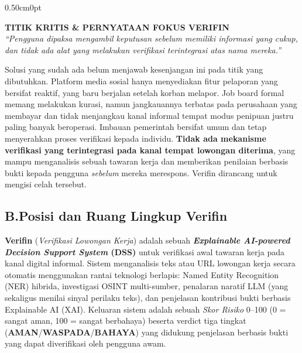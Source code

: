 \documentclass[12pt,a4paper]{article}
\begin{document}
\begin{adjustwidth}{0.50cm}{0pt}
\begin{tcolorbox}[colback=verfinblue!5, colframe=verfinblue!75, boxrule=0.8pt, arc=2mm, left=4mm, right=4mm, top=3mm, bottom=3mm]
\centering\small
\textcolor{verfinblue!90}{\textbf{TITIK KRITIS \& PERNYATAAN FOKUS VERIFIN}} \\[3pt]
\itshape ``Pengguna dipaksa mengambil keputusan sebelum memiliki informasi yang cukup, dan tidak ada alat yang melakukan verifikasi terintegrasi atas nama mereka.''
\end{tcolorbox}
\end{adjustwidth}

Solusi yang sudah ada belum menjawab kesenjangan ini pada titik yang dibutuhkan. Platform media
sosial hanya menyediakan fitur pelaporan yang bersifat reaktif, yang baru berjalan setelah korban
melapor. Job board formal memang melakukan kurasi, namun jangkauannya terbatas pada perusahaan
yang membayar dan tidak menjangkau kanal informal tempat modus penipuan justru paling banyak
beroperasi. Imbauan pemerintah bersifat umum dan tetap menyerahkan proses verifikasi kepada
individu. \textbf{Tidak ada mekanisme verifikasi yang terintegrasi pada kanal tempat lowongan
diterima}, yang mampu menganalisis sebuah tawaran kerja dan memberikan penilaian berbasis bukti
kepada pengguna \textit{sebelum} mereka merespons. Verifin dirancang untuk mengisi celah tersebut.

\subsection*{B.\quad Posisi dan Ruang Lingkup Verifin}

\textbf{Verifin} (\textit{Verifikasi Lowongan Kerja}) adalah sebuah \textbf{\textit{Explainable
AI-powered Decision Support System} (DSS)} untuk verifikasi awal tawaran kerja pada kanal digital
informal. Sistem menganalisis teks atau URL lowongan kerja secara otomatis menggunakan rantai
teknologi berlapis: Named Entity Recognition (NER) hibrida, investigasi
OSINT multi-sumber, penalaran naratif LLM (yang sekaligus menilai sinyal perilaku teks), dan
penjelasan kontribusi bukti berbasis Explainable
AI (XAI).
Keluaran sistem adalah sebuah \textit{Skor Risiko} 0--100 (0 = sangat aman, 100 = sangat berbahaya)
beserta verdict tiga tingkat (\textbf{AMAN}/\textbf{WASPADA}/\textbf{BAHAYA}) yang didukung penjelasan berbasis bukti yang
dapat diverifikasi oleh pengguna awam.
\end{document}
